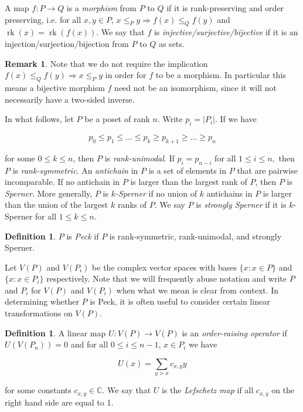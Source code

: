 \documentclass[10 pt]{amsart}
\theoremstyle{plain}
\theoremstyle{definition}
\newtheorem{defn}[thm]{Definition}
\newtheorem{rem}[thm]{Remark}
\theoremstyle{remark}
\numberwithin{equation}{section}
\newcommand\rk{\operatorname{rk}}
\begin{document}
A map $f\colon P\rightarrow Q$ is a \textit{morphism} from $P$ to $Q$ if it is rank-preserving and order preserving, i.e. for all $x,y\in P$, $x\le_P y \Rightarrow f(x)\le_Q f(y)$ and $\rk(x) = \rk(f(x))$.  We say that $f$ is \textit{injective/surjective/bijective} if it is an injection/surjection/bijection from $P$ to $Q$ as sets.

\begin{rem}\label{rem:bijective_morphism_not_isomorphism}
Note that we do not require the implication $f(x)\le_Q f(y) \Rightarrow x\le_P y$ in order for $f$ to be a morphism.  In particular this means a bijective morphism $f$ need not be an isomorphism, since it will not necessarily have a two-sided inverse.  
\end{rem}


In what follows, let $P$ be a poset of rank $n$. Write $p_i = |P_i|$.  If we have

$$p_0\le p_1\le \ldots \le p_k \ge p_{k+1} \ge\ldots \ge p_n$$

\noindent for some $0\le k\le n$, then $P$ is \textit{rank-unimodal}. If $p_i = p_{n-i}$ for all $1\le i\le n,$ then $P$ is \textit{rank-symmetric}.  An \textit{antichain} in $P$ is a set of elements in $P$ that are pairwise incomparable.  If no antichain in $P$ is larger than the largest rank of $P$, then $P$ is \textit{Sperner}.  More generally, $P$ is \textit{$k$-Sperner} if no union of $k$ antichains in $P$ is larger than the union of the largest $k$ ranks of $P$. We say $P$ is \textit{strongly Sperner} if it is $k$-Sperner for all $1\le k\le n$.

\begin{defn}
$P$ is \textit{Peck} if $P$ is rank-symmetric, rank-unimodal, and strongly Sperner.
\end{defn}


Let $V(P)$ and $V(P_i)$ be the complex vector spaces with bases $\{x :x\in P\}$ and $\{x :x\in P_i\}$ respectively.  Note that we will frequently abuse notation and write $P$ and $P_i$ for $V(P)$ and $V(P_i)$ when what we mean is clear from context.  In determining whether $P$ is Peck, it is often useful to consider certain linear transformations on $V(P)$.

\begin{defn}
\label{defn:lefschetz}
A linear map $U\colon V(P)\rightarrow V(P)$ is an \textit{order-raising operator} if $U(V(P_n)) = 0$ and for all $0\le i\le n-1$, $x\in P_i$ we have

$$U(x) = \sum_{y\gtrdot x} c_{x,y}y$$

\noindent for some constants $c_{x,y}\in \mathbb{C}$.  We say that $U$ is the \textit{Lefschetz map} if all $c_{x,y}$ on the right hand side are equal to 1.
\end{defn}
\end{document}
